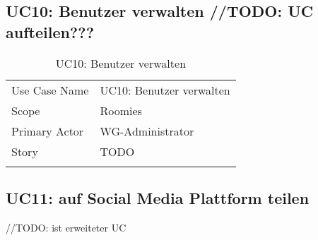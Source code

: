 \subsection{UC10: Benutzer verwalten //TODO: UC aufteilen???}
\begin{table}[H]
	\tablestyle
	\tablealtcolored
	\begin{tabularx}{\textwidth}{lX}
		\tablebody
			Use Case Name &
			UC10: Benutzer verwalten
			\tabularnewline
			Scope &
			Roomies
			\tabularnewline
			Primary Actor &
			WG-Administrator
			\tabularnewline
			Story &
			TODO
			\tabularnewline
		\tableend
	\end{tabularx}
	\caption{UC10: Benutzer verwalten}
\end{table}


\subsection{UC11: auf Social Media Plattform teilen}

//TODO: ist erweiteter UC
